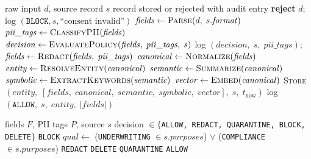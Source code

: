 \documentclass[11pt,twocolumn]{article}
\begin{document}
\begin{algorithm}[H]
\caption{\textsc{Ingest} --- Accretion Disk Pipeline}
\label{alg:ingest}
\begin{algorithmic}[1]
\REQUIRE raw input $d$, source record $s$
\ENSURE record stored or rejected with audit entry
  \STATE \textbf{reject} $d$; log $(\texttt{BLOCK}, s, \text{``consent invalid''})$
  \RETURN
\ENDIF
\STATE $\mathit{fields} \leftarrow \textsc{Parse}(d,\; s.\mathit{format})$
\STATE $\mathit{pii\_tags} \leftarrow \textsc{ClassifyPII}(\mathit{fields})$ 
\STATE $\mathit{decision} \leftarrow \textsc{EvaluatePolicy}(\mathit{fields},\; \mathit{pii\_tags},\; s)$
  \STATE log $(\mathit{decision},\; s,\; \mathit{pii\_tags})$; \RETURN
\ENDIF
{}
  \STATE $\mathit{fields} \leftarrow \textsc{Redact}(\mathit{fields},\; \mathit{pii\_tags})$
\ENDIF
\STATE $\mathit{canonical} \leftarrow \textsc{Normalize}(\mathit{fields})$ 
\STATE $\mathit{entity} \leftarrow \textsc{ResolveEntity}(\mathit{canonical})$
\STATE $\mathit{semantic} \leftarrow \textsc{Summarize}(\mathit{canonical})$ 
\STATE $\mathit{symbolic} \leftarrow \textsc{ExtractKeywords}(\mathit{semantic})$ 
\STATE $\mathit{vector} \leftarrow \textsc{Embed}(\mathit{canonical})$
\STATE \textsc{Store}$(\mathit{entity},\; [\mathit{fields},\; \mathit{canonical},\; \mathit{semantic},\; \mathit{symbolic},\; \mathit{vector}],\; s,\; t_{\text{now}})$
\STATE log $(\texttt{ALLOW},\; s,\; \mathit{entity},\; |\mathit{fields}|)$
\end{algorithmic}
\end{algorithm}

\begin{algorithm}[H]
\caption{\textsc{EvaluatePolicy} --- Deterministic Policy Engine}
\label{alg:policy}
\begin{algorithmic}[1]
\REQUIRE fields $F$, PII tags $P$, source $s$
\ENSURE decision $\in \{$\texttt{ALLOW, REDACT, QUARANTINE, BLOCK, DELETE}$\}$
  \RETURN \texttt{BLOCK}
\ENDIF
{} %
  \STATE $\mathit{qual} \leftarrow$ (\texttt{UNDERWRITING} $\in s.\mathit{purposes}$) $\lor$ (\texttt{COMPLIANCE} $\in s.\mathit{purposes}$)
    \RETURN \texttt{REDACT}
  \ENDIF
\ENDIF
{}
  \RETURN \texttt{DELETE}
\ENDIF
{}
  \RETURN \texttt{QUARANTINE} 
\ENDIF
\RETURN \texttt{ALLOW}
\end{algorithmic}
\end{algorithm}
\end{document}
